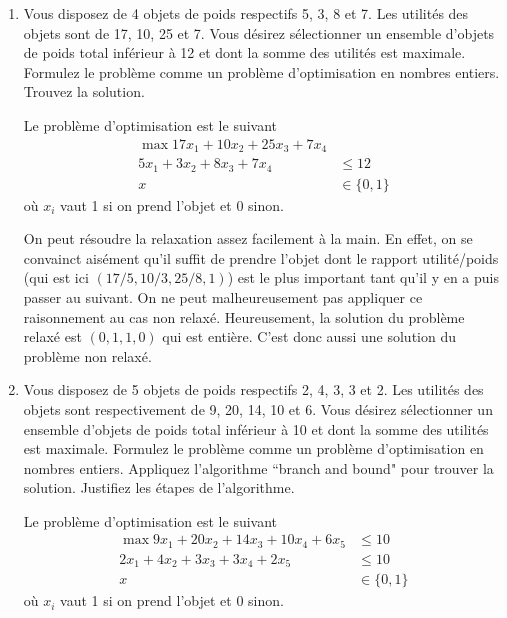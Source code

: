 \begin{enumerate}
  \item Vous disposez de 4 objets de poids respectifs 5, 3, 8 et 7. Les utilités des
    objets sont de 17, 10, 25 et 7. Vous désirez sélectionner un ensemble d'objets de poids total inférieur  à 12 et dont la somme
    des utilités est maximale.  Formulez le problème comme un problème d'optimisation en nombres entiers. Trouvez la solution.


    \begin{solution}
      Le problème d'optimisation est le suivant
      \begin{align*}
        \max 17x_1 + 10x_2 + 25x_3 + 7x_4\\
        5x_1 + 3x_2 + 8x_3 + 7x_4 & \leq 12\\
        x & \in \{0,1\}
      \end{align*}
      où $x_i$ vaut 1 si on prend l'objet et 0 sinon.

      On peut résoudre la relaxation assez facilement à la main.
      En effet, on se convainct aisément qu'il
      suffit de prendre l'objet dont le rapport utilité/poids
      (qui est ici $(17/5,10/3,25/8,1)$)
      est le plus important tant qu'il y en a puis passer au suivant.
      On ne peut malheureusement pas appliquer ce raisonnement au cas
      non relaxé.
      Heureusement, la solution du problème relaxé est $(0,1,1,0)$ qui
      est entière.
      C'est donc aussi une solution du problème non relaxé.
    \end{solution}

  \item Vous disposez de 5 objets de poids respectifs 2, 4, 3, 3 et 2. Les
    utilités des objets sont respectivement de 9, 20, 14, 10 et 6. Vous désirez
    sélectionner un ensemble d'objets de poids total inférieur  à 10
    et dont la somme des utilités est maximale.  Formulez le problème
    comme un problème d'optimisation en nombres entiers. Appliquez l'algorithme ``branch and bound" pour trouver la
    solution. Justifiez les étapes de l'algorithme.

    \begin{solution}
      Le problème d'optimisation est le suivant
      \begin{align*}
        \max 9x_1 + 20x_2 + 14x_3 + 10x_4 + 6x_5 & \leq 10\\
        2x_1 + 4x_2 + 3x_3 + 3x_4 + 2x_5 & \leq 10\\
        x & \in \{0,1\}
      \end{align*}
      où $x_i$ vaut 1 si on prend l'objet et 0 sinon.


\end{solution}
\end{enumerate}
